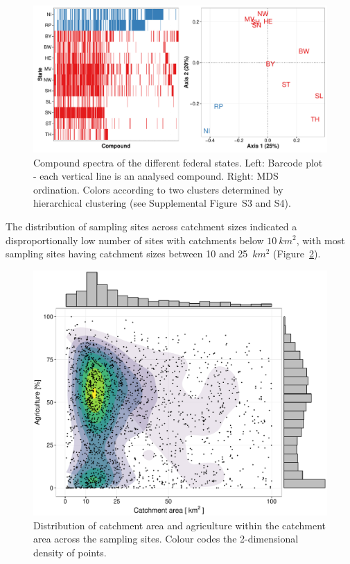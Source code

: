 \documentclass[journal=esthag,manuscript=article]{achemso}
\begin{document}
\begin{figure}[ht]
  \includegraphics[width=\textwidth]{figure2.pdf}
  \caption{Compound spectra of the different federal states. Left: Barcode plot - each vertical line is an analysed compound. Right: MDS ordination. 
  Colors according to two clusters determined by hierarchical clustering (see Supplemental Figure~S3 and S4).}
  \label{fig:fig2}
\end{figure}

The distribution of sampling sites across catchment sizes indicated a disproportionally low number of sites with catchments below $10~km^2$, with
most sampling sites having catchment sizes between 10 and 25~$km^2$ (Figure~\ref{fig:fig3}). 


\begin{figure}[ht]
  \includegraphics[width=.8\textwidth]{figure3.pdf}
  \caption{Distribution of catchment area and agriculture within the catchment area across the sampling sites.
  Colour codes the 2-dimensional density of points.}
  \label{fig:fig3}
\end{figure}
\end{document}
